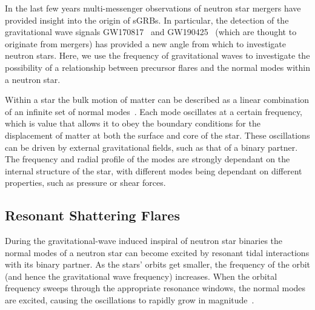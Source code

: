 \documentclass[fleqn,usenatbib]{mnras}
\begin{document}
\hspace{\parindent}In the last few years multi-messenger observations of neutron star mergers have provided insight into the origin of sGRBs. In particular, the detection of the gravitational wave signals GW170817~\citet{abbott2017merger} and GW190425~\citet{abbott2020gw190425} (which are thought to originate from mergers) has provided a new angle from which to investigate neutron stars. Here, we use the frequency of gravitational waves to investigate the possibility of a relationship between precursor flares and the normal modes within a neutron star.%

\hspace{\parindent}Within a star the bulk motion of matter can be described as a linear combination of an infinite set of normal modes~\citet{smeyers2011linear}. Each mode oscillates at a certain frequency, which is value that allows it to obey the boundary conditions for the displacement of matter at both the surface and core of the star. These oscillations can be driven by external gravitational fields, such as that of a binary partner. The frequency and radial profile of the modes are strongly dependant on the internal structure of the star, with different modes being dependant on different properties, such as pressure or shear forces.%





\subsection{Resonant Shattering Flares}
\hspace{\parindent}During the gravitational-wave induced inspiral of neutron star binaries the normal modes of a neutron star can become excited by resonant tidal interactions with its binary partner. As the stars' orbits get smaller, the frequency of the orbit (and hence the gravitational wave frequency) increases. When the orbital frequency sweeps through the appropriate resonance windows, the normal modes are excited, causing the oscillations to rapidly grow in magnitude~\citep{tsang2012resonant, tsang2013shattering, lai1994resonant}.
\end{document}

